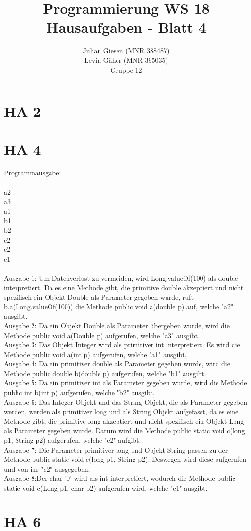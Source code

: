 \documentclass[a4paper]{article}
\title{ Programmierung WS 18 \\ Hausaufgaben - Blatt 4 }
\author{ Julian Giesen (MNR 388487) \\
Levin Gäher (MNR 395035) \\
Gruppe 12 }
\date{  }
\begin{document}
\maketitle

\section*{ HA 2 }




\section*{ HA 4 }

Programmausgabe:\\
\\
a2\\
a3\\
a1\\
b1\\
b2\\
c2\\
c2\\
c1\\
\\
Ausgabe 1: Um Datenverlust zu vermeiden, wird Long.valueOf(100) als double interpretiert. Da es eine Methode gibt, die primitive double akzeptiert und nicht spezifisch ein Objekt Double als Parameter gegeben wurde, ruft b.a(Long.valueOf(100)) die Methode public void a(double p) auf, welche "a2" ausgibt.\\
Ausgabe 2: Da ein Objekt Double als Parameter übergeben wurde, wird die Methode public void a(Double p) aufgerufen, welche "a3" ausgibt.\\
Ausgabe 3: Das Objekt Integer wird als primitiver int interpretiert. Es wird die Methode public void a(int p) aufgerufen, welche "a1" ausgibt. \\
Ausgabe 4: Da ein primitiver double als Parameter gegeben wurde, wird die Methode public double b(double p) aufgerufen, welche "b1" ausgibt. \\
Ausgabe 5: Da ein primitiver int als Parameter gegeben wurde, wird die Methode public int b(int p) aufgerufen, welche "b2" ausgibt. \\
Ausgabe 6: Das Integer Objekt und das String Objekt, die als Parameter gegeben werden, werden als primitiver long und als String Objekt aufgefasst, da es eine Methode gibt, die primitive long akzeptiert und nicht spezifisch ein Objekt Long als Parameter gegeben wurde. Darum wird die Methode public static void c(long p1, String p2) aufgerufen, welche "c2" aufgibt.\\
Ausgabe 7: Die Parameter primitiver long und Objekt String passen zu der Methode public static void c(long p1, String p2). Deswegen wird diese aufgerufen und von ihr "c2" ausgegeben.\\
Ausgabe 8:Der char ’0’ wird als int interpretiert, wodurch die Methode public static void c(Long p1, char p2) aufgerufen wird, welche "c1" ausgibt.\\


\section*{ HA 6 }
\end{document}
